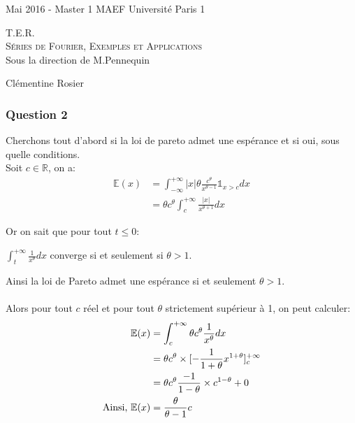 \documentclass[a4paper,11pt]{article}
\theoremstyle{remark}
\begin{document}
\noindent\Large{Mai 2016 - Master 1 MAEF}
\hspace{27mm}
\Large{Universit\'e Paris 1}

\vspace{70mm}
\begin{center} \textsc{\Huge{T.E.R. \\ S\'eries de Fourier, Exemples et Applications}}\\
\vspace{5mm}
\Large{Sous la direction de M.Pennequin}
\end{center}
\vspace{80mm}
\begin{flushright}\Large{Cl\'ementine Rosier}
\end{flushright}
\newpage

\subsubsection*{Question 2}
Cherchons tout d'abord si la loi de pareto admet une esp\'erance et si oui, sous quelle conditions. \\

Soit $c\in\mathbb{R}$, on a: \\

\begin{align*}
\mathbb{E}(x)&= \int_{-\infty}^{+\infty}|x|\theta\frac{c^{\theta}}{x^{\theta-1}} \mathds{1}_{x>c} dx \\
			 &= \theta c^{\theta}  \int_{c}^{+\infty} \frac{|x|}{x^{\theta + 1}} dx
\end{align*}

 Or on sait que pour tout $t\leq0$:\\
 \begin{center}
 	$\int_{t}^{+\infty}\frac{1}{x^{\theta}}dx$ converge si et seulement si $ \theta>1$.
 \end{center}
Ainsi la loi de Pareto admet une esp\'erance si et seulement $\theta>1$.\\
\\
Alors pour tout $c$ r\'eel et pour tout $\theta$ strictement sup\'erieur \`a 1, on peut calculer:\\

\begin{align*}
\mathbb{E}(x)&= \int_{c}^{+\infty} \theta c^{\theta} \frac{1}{x^{\theta}}dx\\
			&= \theta c^{\theta}\times [-\frac{1}{1+\theta}x^{1+\theta}]^{+\infty}_{c}\\
			&= \theta c^{\theta} \frac{-1}{1 - \theta}\times c^{1-\theta} +0\\
\textnormal{Ainsi, } \mathbb{E}(x)&= \frac{\theta}{\theta -1}c
\end{align*}
\end{document}
